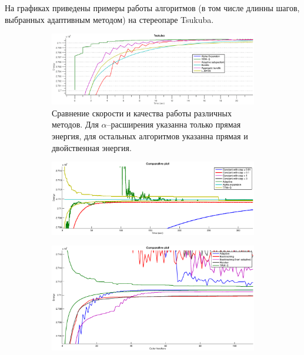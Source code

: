 \documentclass{article}
\begin{document}
На графиках приведены примеры работы алгоритмов (в том числе
длинны шагов, выбранных адаптивным методом) на стереопаре Tsukuba.
\begin{figure}
    \centering
    \begin{subfigure}[t]{\textwidth}
            \centering
            \includegraphics[width=1.5\textwidth]{comparative_tsukuba.eps}
            \caption{Сравнение скорости и качества работы различных методов.
                    Для $\alpha$--расширения указанна только прямая энергия,
                    для остальных алгоритмов указанна прямая и двойственная энергия.}
    \end{subfigure}
    \begin{subfigure}[t]{\textwidth}
            \centering
            \includegraphics[width=1.5\textwidth]{comparative_tsukuba_small.eps}
    \end{subfigure}
    \begin{subfigure}[t]{\textwidth}
            \centering
            \includegraphics[width=1.5\textwidth]{1d_optimization.eps}
    \end{subfigure}
\end{figure}
\end{document}
